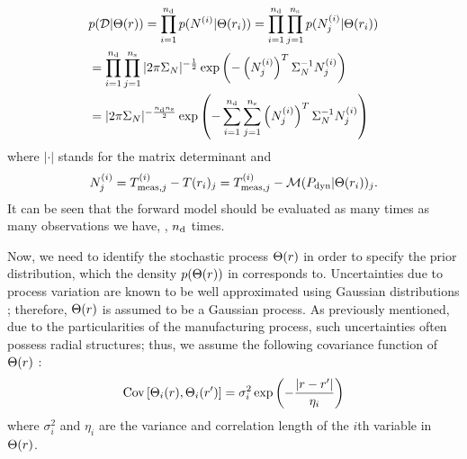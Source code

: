 \begin{align*}
  & \f{\data | \vU(\r)} = \prod_{i = 1}^{\ndata} \f{\mnoise^{(i)} | \vU(\r_i)} = \prod_{i = 1}^{\ndata} \prod_{j = 1}^{\nsteps} \f{\vnoise^{(i)}_j | \vU(\r_i)} \\
  & = \prod_{i = 1}^{\ndata} \prod_{j = 1}^{\nsteps} |2 \pi \mSigma_\noise|^{-\frac{1}{2}} \exp\left( -\left(\vnoise_j^{(i)}\right)^T \mSigma^{-1}_\noise \noise_j^{(i)} \right) \\
  & = |2 \pi \mSigma_\noise|^{-\frac{\ndata \nsteps}{2}} \exp\left( -\sum_{i = 1}^{\ndata} \sum_{j = 1}^{\nsteps} \left(\vnoise_j^{(i)}\right)^T \mSigma^{-1}_\noise \noise_j^{(i)} \right)
\end{align*}
where $|\cdot|$ stands for the matrix determinant and
\[
  N_j^{(i)} = T^{(i)}_{\text{meas}, j} - T(r_i)_j = T^{(i)}_{\text{meas}, j} - \mathcal{M}( P_{\text{dyn}} | \Theta(r_i) )_j.
\]
It can be seen that the forward model should be evaluated as many times as many observations we have, \ie, $n_\text{d}$ times.

Now, we need to identify the stochastic process $\Theta(r)$ in order to specify the prior distribution, which the density $\f{\vU(\r)}$ in  corresponds to. Uncertainties due to process variation are known to be well approximated using Gaussian distributions \cite{srivastava2010}; therefore, $\Theta(r)$ is assumed to be a Gaussian process. As previously mentioned, due to the particularities of the manufacturing process, such uncertainties often possess radial structures; thus, we assume the following covariance function of $\Theta(r)$ \cite{maitre2010}:
\begin{equation} \elabel{covariance-function}
  \cov{\vU_i(\r)}{\vU_i(\r')} = \sigma_i^2 \exp\left(-\frac{|\r - \r'|}{\eta_i}\right)
\end{equation}
where $\sigma_i^2$ and $\eta_i$ are the variance and correlation length of the $i$th variable in $\Theta(r)$.
